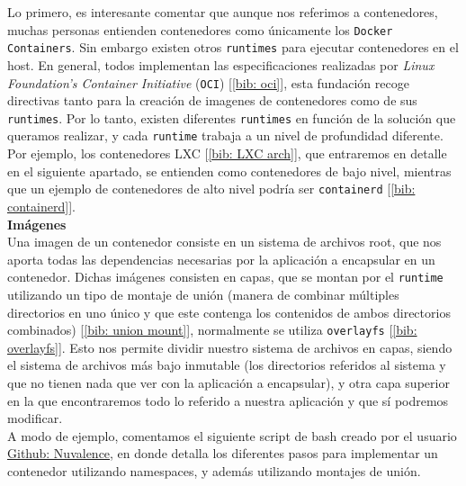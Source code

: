 \documentclass[a4paper, oneside, 12pt]{book}
\begin{document}
	\noindent Lo primero, es interesante comentar que aunque nos referimos a contenedores, muchas personas entienden contenedores como únicamente los \texttt{Docker Containers}. Sin embargo existen otros \texttt{runtimes} para ejecutar contenedores en el host. En general, todos implementan las especificaciones realizadas por \textit{Linux Foundation's Container Initiative} (\texttt{OCI}) [\ref{bib: oci}], esta fundación recoge directivas tanto para la creación de imagenes de contenedores como de sus \texttt{runtimes}. Por lo tanto, existen diferentes \texttt{runtimes} en función de la solución que queramos realizar, y cada \texttt{runtime} trabaja a un nivel de profundidad diferente. Por ejemplo, los contenedores LXC [\ref{bib: LXC arch}], que entraremos en detalle en el siguiente apartado, se entienden como contenedores de bajo nivel, mientras que un ejemplo de contenedores de alto nivel podría ser \texttt{containerd} [\ref{bib: containerd}]. \\
	
	\noindent \textbf{\large Imágenes}\\
	
	\noindent Una imagen de un contenedor consiste en un sistema de archivos root, que nos aporta todas las dependencias necesarias por la aplicación a encapsular en un contenedor. Dichas imágenes consisten en capas, que se montan por el \texttt{runtime} utilizando un tipo de montaje de unión (manera de combinar múltiples directorios en uno único y que este contenga los contenidos de ambos directorios combinados) [\ref{bib: union mount}], normalmente se utiliza \texttt{overlayfs} [\ref{bib: overlayfs}]. Esto nos permite dividir nuestro sistema de archivos en capas, siendo el sistema de archivos más bajo inmutable (los directorios referidos al sistema y que no tienen nada que ver con la aplicación a encapsular), y otra capa superior en la que encontraremos todo lo referido a nuestra aplicación y que sí podremos modificar. \\
	
	\noindent A modo de ejemplo, comentamos el siguiente script de bash creado por el usuario \href{https://github.com/Nuvalence/diy-container}{Github: Nuvalence}, en donde detalla los diferentes pasos para implementar un contenedor utilizando namespaces, y además utilizando montajes de unión.
	
\end{document}
